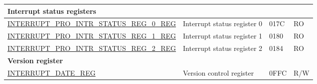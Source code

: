 \begin{longtable}{ | m{9.3cm} | m{9.2cm} | m{1.3cm} | m{1.2cm} | }
\multicolumn{4}{|l|}{\textbf{Interrupt status registers}} \\ \hline
\hyperref[regdesc:INTERRUPTPROINTRSTATUSREG0REG]{INTERRUPT\_PRO\_INTR\_STATUS\_REG\_0\_REG} & Interrupt status register 0 & \hexprefix{}017C & RO \\ \hline
\hyperref[regdesc:INTERRUPTPROINTRSTATUSREG1REG]{INTERRUPT\_PRO\_INTR\_STATUS\_REG\_1\_REG} & Interrupt status register 1 & \hexprefix{}0180 & RO \\ \hline
\hyperref[regdesc:INTERRUPTPROINTRSTATUSREG2REG]{INTERRUPT\_PRO\_INTR\_STATUS\_REG\_2\_REG} & Interrupt status register 2 & \hexprefix{}0184 & RO \\ \hline
\multicolumn{4}{|l|}{\textbf{Version register}} \\ \hline
\hyperref[regdesc:INTERRUPTREGDATEREG]{INTERRUPT\_DATE\_REG} & Version control register & \hexprefix{}0FFC & R/W \\ \hline
\end{longtable}
